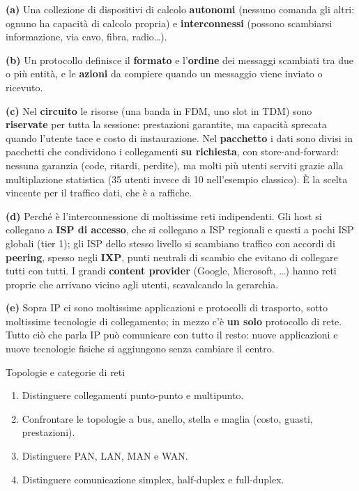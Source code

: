 \svolgimento
\textbf{(a)} Una collezione di dispositivi di calcolo \textbf{autonomi} (nessuno comanda gli altri: ognuno ha capacità di calcolo
propria) e \textbf{interconnessi} (possono scambiarsi informazione, via cavo, fibra, radio\dots).

\textbf{(b)} Un protocollo definisce il \textbf{formato} e l'\textbf{ordine} dei messaggi scambiati tra due o più entità, e le
\textbf{azioni} da compiere quando un messaggio viene inviato o ricevuto.

\textbf{(c)} Nel \textbf{circuito} le risorse (una banda in FDM, uno slot in TDM) sono \textbf{riservate} per tutta la sessione: prestazioni
garantite, ma capacità sprecata quando l'utente tace e costo di instaurazione. Nel \textbf{pacchetto} i dati sono divisi in pacchetti che
condividono i collegamenti \textbf{su richiesta}, con store-and-forward: nessuna garanzia (code, ritardi, perdite), ma molti più utenti
serviti grazie alla multiplazione statistica (35 utenti invece di 10 nell'esempio classico). È la scelta vincente per il traffico dati, che
è a raffiche.

\textbf{(d)} Perché è l'interconnessione di moltissime reti indipendenti. Gli host si collegano a \textbf{ISP di accesso}, che si collegano
a ISP regionali e questi a pochi ISP globali (tier 1); gli ISP dello stesso livello si scambiano traffico con accordi di
\textbf{peering}, spesso negli \textbf{IXP}, punti neutrali di scambio che evitano di collegare tutti con tutti. I grandi
\textbf{content provider} (Google, Microsoft, \dots) hanno reti proprie che arrivano vicino agli utenti, scavalcando la gerarchia.

\textbf{(e)} Sopra IP ci sono moltissime applicazioni e protocolli di trasporto, sotto moltissime tecnologie di collegamento; in mezzo
c'è \textbf{un solo} protocollo di rete. Tutto ciò che parla IP può comunicare con tutto il resto: nuove applicazioni e nuove tecnologie
fisiche si aggiungono senza cambiare il centro.

\begin{esercizio}{Topologie e categorie di reti}
\begin{enumerate}[label=(\alph*)]
    \item Distinguere collegamenti punto-punto e multipunto.
    \item Confrontare le topologie a bus, anello, stella e maglia (costo, guasti, prestazioni).
    \item Distinguere PAN, LAN, MAN e WAN.
    \item Distinguere comunicazione simplex, half-duplex e full-duplex.
\end{enumerate}
\end{esercizio}

